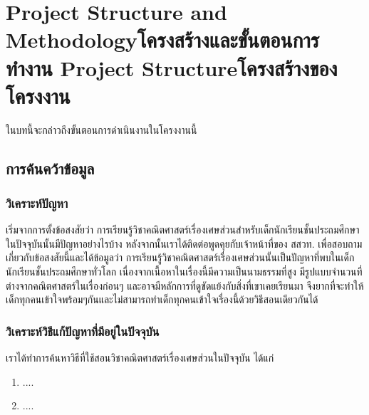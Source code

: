 \chapter{\ifproject%
\ifenglish Project Structure and Methodology\else โครงสร้างและขั้นตอนการทำงาน\fi
\else%
\ifenglish Project Structure\else โครงสร้างของโครงงาน\fi
\fi
}

ในบทนี้จะกล่าวถึงขั้นตอนการดำเนินงานในโครงงานนี้

\makeatletter


\makeatother

\section{การค้นคว้าข้อมูล}

\subsection{วิเคราะห์ปัญหา}
 เริ่มจากการตั้งข้อสงสัยว่า การเรียนรู้วิชาคณิตศาสตร์เรื่องเศษส่วนสำหรับเด็กนักเรียนชั้นประถมศึกษาในปัจจุบันนั้นมีปัญหาอย่างไรบ้าง
 หลังจากนั้นเราได้ติดต่อพูดคุยกับเจ้าหน้าที่ของ สสวท. เพื่อสอบถามเกี่ยวกับข้อสงสัยนี้และได้ข้อมูลว่า การเรียนรู้วิชาคณิตศาสตร์เรื่องเศษส่วนนั้นเป็นปัญหาที่พบในเด็กนักเรียนชั้นประถมศึกษาทั่วโลก
 เนื่องจากเนื้อหาในเรื่องนี้มีความเป็นนามธรรมที่สูง มีรูปแบบจำนวนที่ต่างจากคณิตศาสตร์ในเรื่องก่อนๆ และอาจมีหลักการที่ดูขัดแย้งกับสิ่งที่เขาเคยเรียนมา จึงยากที่จะทำให้เด็กทุกคนเข้าใจพร้อมๆกันและไม่สามารถทำเด็กทุกคนเข้าใจเรื่องนี้ด้วยวิธีสอนเดียวกันได้

\subsection{วิเคราะห์วิธีแก้ปัญหาที่มีอยู่ในปัจจุบัน}
เราได้ทำการค้นหาวิธีที่ใช้สอนวิชาคณิตศาสตร์เรื่องเศษส่วนในปัจจุบัน ได้แก่
\begin{enumerate}
    \item ....
    \item ....
\end{enumerate}

